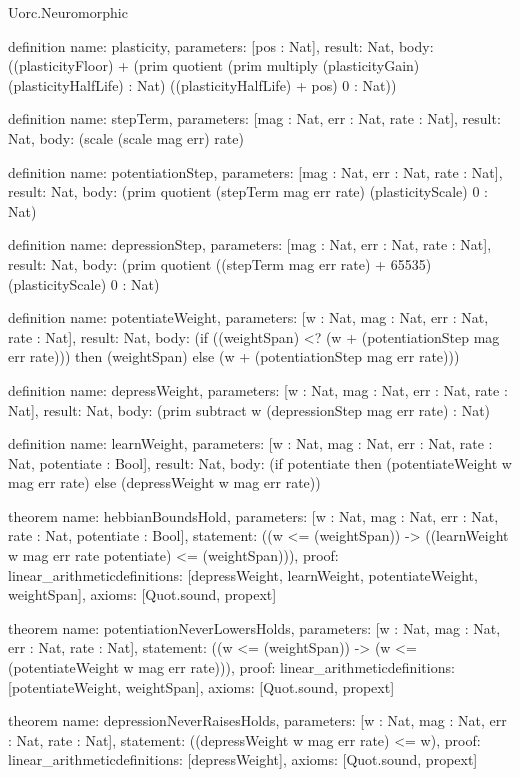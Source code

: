 \begin{lexlean}{Uorc.Neuromorphic}
\begin{semanticmodule}
definition{
  name: plasticity,
  parameters: [pos : Nat],
  result: Nat,
  body: ((plasticityFloor) + (prim quotient (prim multiply (plasticityGain) (plasticityHalfLife) : Nat) ((plasticityHalfLife) + pos) 0 : Nat))
}

definition{
  name: stepTerm,
  parameters: [mag : Nat, err : Nat, rate : Nat],
  result: Nat,
  body: (scale (scale mag err) rate)
}

definition{
  name: potentiationStep,
  parameters: [mag : Nat, err : Nat, rate : Nat],
  result: Nat,
  body: (prim quotient (stepTerm mag err rate) (plasticityScale) 0 : Nat)
}

definition{
  name: depressionStep,
  parameters: [mag : Nat, err : Nat, rate : Nat],
  result: Nat,
  body: (prim quotient ((stepTerm mag err rate) + 65535) (plasticityScale) 0 : Nat)
}

definition{
  name: potentiateWeight,
  parameters: [w : Nat, mag : Nat, err : Nat, rate : Nat],
  result: Nat,
  body: (if ((weightSpan) <? (w + (potentiationStep mag err rate))) then (weightSpan) else (w + (potentiationStep mag err rate)))
}

definition{
  name: depressWeight,
  parameters: [w : Nat, mag : Nat, err : Nat, rate : Nat],
  result: Nat,
  body: (prim subtract w (depressionStep mag err rate) : Nat)
}

definition{
  name: learnWeight,
  parameters: [w : Nat, mag : Nat, err : Nat, rate : Nat, potentiate : Bool],
  result: Nat,
  body: (if potentiate then (potentiateWeight w mag err rate) else (depressWeight w mag err rate))
}

theorem{
  name: hebbianBoundsHold,
  parameters: [w : Nat, mag : Nat, err : Nat, rate : Nat, potentiate : Bool],
  statement: ((w <= (weightSpan)) -> ((learnWeight w mag err rate potentiate) <= (weightSpan))),
  proof: linear_arithmetic{definitions: [depressWeight, learnWeight, potentiateWeight, weightSpan]},
  axioms: [Quot.sound, propext]
}

theorem{
  name: potentiationNeverLowersHolds,
  parameters: [w : Nat, mag : Nat, err : Nat, rate : Nat],
  statement: ((w <= (weightSpan)) -> (w <= (potentiateWeight w mag err rate))),
  proof: linear_arithmetic{definitions: [potentiateWeight, weightSpan]},
  axioms: [Quot.sound, propext]
}

theorem{
  name: depressionNeverRaisesHolds,
  parameters: [w : Nat, mag : Nat, err : Nat, rate : Nat],
  statement: ((depressWeight w mag err rate) <= w),
  proof: linear_arithmetic{definitions: [depressWeight]},
  axioms: [Quot.sound, propext]
}


\end{semanticmodule}
\end{lexlean}
